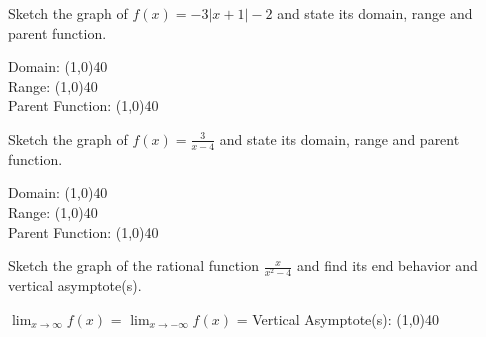 \documentclass[addpoints]{exam}
\begin{document}
\begin{questions}
    \newpage
    \question[1] Sketch the graph of $f(x) = -3|x+1| - 2$ and state its domain, range and parent function.
    
        \begin{left} 
        \end{left}
        
    Domain: \line(1,0){40} \\
    \newline
    Range: \line(1,0){40} \\
    \newline
    Parent Function: \line(1,0){40} \\
    
    \question[1] Sketch the graph of $f(x) = \frac{3}{x - 4}$ and state its domain, range and parent function.
    
        \begin{left} 
        \end{left}
        
    Domain: \line(1,0){40} \\
    \newline
    Range: \line(1,0){40} \\
    \newline
    Parent Function: \line(1,0){40} \\
    
    \question[1] Sketch the graph of the rational function $\frac{x}{x^2 - 4}$ and find its end behavior and vertical asymptote(s).
    
        \begin{left} 
        \end{left}
    
    $\lim_{x\to\infty} f(x)$ =
    \newline    
    $\lim_{x\to-\infty} f(x)$ =
    \newline
    Vertical Asymptote(s): \line(1,0){40} \\
    

\end{questions}
\end{document}
